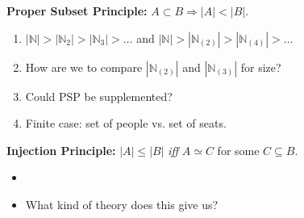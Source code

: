 \documentclass[handout]{beamer}
\newcommand{\abs}[1]{|#1|} %
\newcommand{\N}{\mathbb{N}}
\begin{document}

\begin{frame}

  \textbf{Proper Subset Principle:} $A\subset B \Rightarrow \abs{A}<\abs{B}$.
  \pause

  \begin{enumerate}
    \item $\abs{\N}>\abs{\N_{2}}>\abs{\N_{3}}>\ldots$ and $\abs{\N}>\abs{\N_{(2)}}>\abs{\N_{(4)}}>\ldots$
    \item How are we to compare $\abs{\N_{(2)}}$ and $\abs{\N_{(3)}}$ for size?
    \item Could PSP be supplemented?
    \item Finite case: set of people vs. set of seats.
  \end{enumerate}
  \vspace{.2in}
  \pause

  \textbf{Injection Principle:} $\abs{A} \leq \abs{B}$ \textit{iff} $A \simeq C$ for some $C\subseteq B$. 
  \pause

  \begin{itemize}
    \item 
    \item What kind of theory does this give us?
  \end{itemize}


\end{frame}

\end{document}
